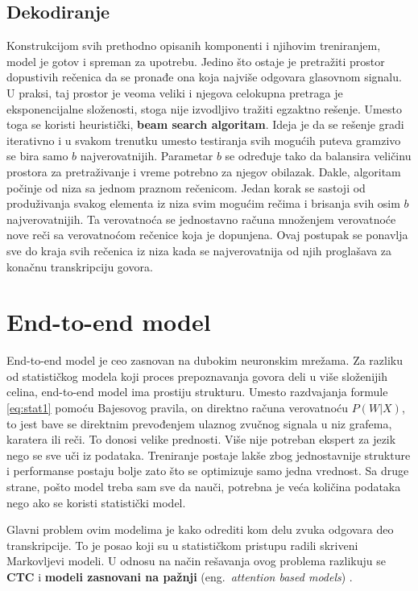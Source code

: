 \documentclass[a4paper]{article}
\begin{document}
\subsection{Dekodiranje}
\label{sec:dekodiranje}

Konstrukcijom svih prethodno opisanih komponenti i njihovim treniranjem, model je gotov i spreman za upotrebu.
Jedino što ostaje je pretražiti prostor dopustivih rečenica da se pronađe ona koja najviše odgovara glasovnom signalu.
U praksi, taj prostor je veoma veliki i njegova celokupna pretraga je eksponencijalne složenosti, stoga nije izvodljivo tražiti egzaktno rešenje.
Umesto toga se koristi heuristički, \textbf{beam search algoritam}.
Ideja je da se rešenje gradi iterativno i u svakom trenutku umesto testiranja svih mogućih puteva gramzivo se bira samo $b$ najverovatnijih.
Parametar $b$ se određuje tako da balansira veličinu prostora za pretraživanje i vreme potrebno za njegov obilazak.
Dakle, algoritam počinje od niza sa jednom praznom rečenicom.
Jedan korak se sastoji od produživanja svakog elementa iz niza svim mogućim rečima i brisanja svih osim $b$ najverovatnijih.
Ta verovatnoća se jednostavno računa množenjem verovatnoće nove reči sa verovatnoćom rečenice koja je dopunjena.
Ovaj postupak se ponavlja sve do kraja svih rečenica iz niza kada se najverovatnija od njih proglašava za konačnu transkripciju govora.

\section{End-to-end model}
\label{sec:e2e}

End-to-end model je ceo zasnovan na dubokim neuronskim mrežama.
Za razliku od statističkog modela koji proces prepoznavanja govora deli u više složenijih celina, end-to-end model ima prostiju strukturu.
Umesto razdvajanja formule \ref{eq:stat1} pomoću Bajesovog pravila, on direktno računa verovatnoću $P(W|X)$, to jest
bave se direktnim prevođenjem ulaznog zvučnog signala u niz grafema, karatera ili reči.
To donosi velike prednosti. Više nije potreban ekspert za jezik nego se sve uči iz podataka. Treniranje postaje lakše zbog jednostavnije strukture i performanse postaju bolje zato što se optimizuje samo jedna vrednost.
Sa druge strane, pošto model treba sam sve da nauči, potrebna je veća količina podataka nego ako se koristi statistički model.

Glavni problem ovim modelima je kako odrediti kom delu zvuka odgovara deo transkripcije.
To je posao koji su u statističkom pristupu radili skriveni Markovljevi modeli.
U odnosu na način rešavanja ovog problema razlikuju se \textbf{CTC} \cite{graves2006ctc} i \textbf{modeli zasnovani na pažnji} (eng.~{\em attention based models}) \cite{chorowski2015attentionbased}.
\end{document}
